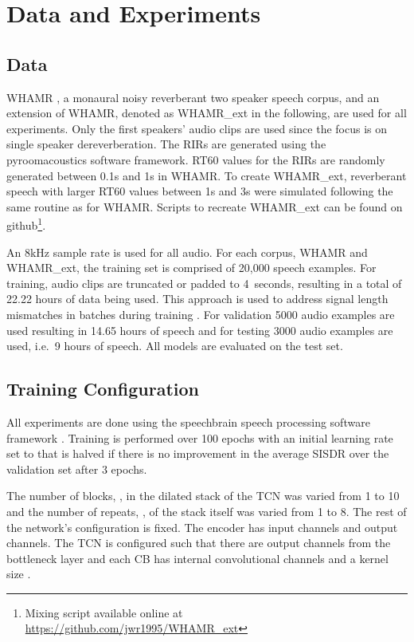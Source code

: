 \documentclass[conference,a4paper]{IEEEtran}
\begin{document}
\section{Data and Experiments}\label{sec:4}
\subsection{Data}
WHAMR \cite{WHAMR}, a monaural noisy reverberant two speaker speech corpus, and an extension of WHAMR, 
{denoted as WHAMR\_ext in the following},
are used for all experiments. Only the first speaker{s'} audio clips are used since the focus is on single speaker dereverberation. The \acp{RIR} are generated using the pyroomacoustics \cite{pyroomacoustics} software framework. RT60 values for the \acp{RIR} are randomly generated between 0.1s and 1s {in WHAMR}. To create WHAMR\_ext, reverberant speech with larger RT60 values between 1s and 3s were simulated following the same routine as {for} WHAMR. 
{Scripts} to recreate WHAMR\_ext {can} be found on github\footnote{{Mixing script available online at} \url{https://github.com/jwr1995/WHAMR\_ext}}.

An 8kHz sample rate is used for all audio. For each corpus, WHAMR and WHAMR\_ext, the training set is comprised of 20,000 speech examples. For training, audio clips are truncated
or padded to 4~seconds, resulting in a total of 22.22 hours of data being used. This approach is used to address signal length mismatches in batches during training \cite{WHAMR}. For validation 5000 audio examples are used {resulting in} 14.65 hours of speech and for testing 3000 audio examples are used{, i.e.~}9 hours of speech. All models are evaluated on the test set.
\subsection{Training Configuration}
All experiments are done using the speechbrain speech processing software framework \cite{speechbrain}. Training is performed over 100 epochs with an initial learning rate set to  that is halved if there is no improvement in the average \ac{SISDR} over the validation set after 3 epochs.

The number of blocks, , in the dilated stack of the \ac{TCN} was varied from 1 to 10 and the number of repeats, , of the stack itself was varied from 1 to 8. The  rest of the network's configuration is fixed. The encoder has  input channels and  output channels. The \ac{TCN} is configured such that there are  output channels from the bottleneck layer and each \ac{CB} has  internal convolutional channels and a kernel size .
\end{document}
